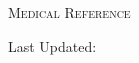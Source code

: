 \documentclass[main.tex]{subfiles}
\begin{document}
	
\thispagestyle{empty}

\centering
\vspace*{2in}
\bfseries \Huge \color{mainColor}

\scshape Medical Reference \vspace{0.5em}

\normalfont \huge  \theauthor

\normalsize Last Updated: \thedate

	
\end{document}
